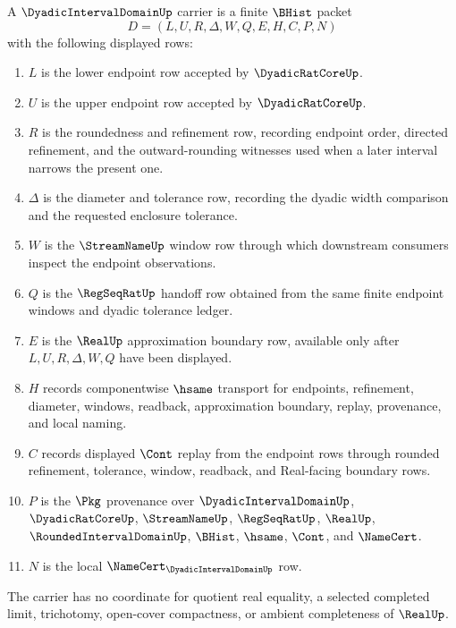 \begin{definition}
\label{def:dyadic-interval-domain-carrier}
A $\DyadicIntervalDomainUp$ carrier is a finite $\BHist$ packet
$$
D=(L,U,R,\Delta,W,Q,E,H,C,P,N)
$$
with the following displayed rows:
\begin{enumerate}
\item $L$ is the lower endpoint row accepted by $\DyadicRatCoreUp$.
\item $U$ is the upper endpoint row accepted by $\DyadicRatCoreUp$.
\item $R$ is the roundedness and refinement row, recording endpoint order, directed refinement, and the outward-rounding witnesses used when a later interval narrows the present one.
\item $\Delta$ is the diameter and tolerance row, recording the dyadic width comparison and the requested enclosure tolerance.
\item $W$ is the $\StreamNameUp$ window row through which downstream consumers inspect the endpoint observations.
\item $Q$ is the $\RegSeqRatUp$ handoff row obtained from the same finite endpoint windows and dyadic tolerance ledger.
\item $E$ is the $\RealUp$ approximation boundary row, available only after $L,U,R,\Delta,W,Q$ have been displayed.
\item $H$ records componentwise $\hsame$ transport for endpoints, refinement, diameter, windows, readback, approximation boundary, replay, provenance, and local naming.
\item $C$ records displayed $\Cont$ replay from the endpoint rows through rounded refinement, tolerance, window, readback, and Real-facing boundary rows.
\item $P$ is the $\Pkg$ provenance over $\DyadicIntervalDomainUp$, $\DyadicRatCoreUp$, $\StreamNameUp$, $\RegSeqRatUp$, $\RealUp$, $\RoundedIntervalDomainUp$, $\BHist$, $\hsame$, $\Cont$, and $\NameCert$.
\item $N$ is the local $\NameCert_{\DyadicIntervalDomainUp}$ row.
\end{enumerate}
The carrier has no coordinate for quotient real equality, a selected completed limit, trichotomy, open-cover compactness, or ambient completeness of $\RealUp$.
\end{definition}

